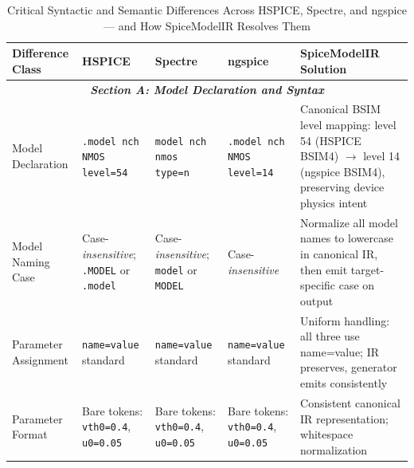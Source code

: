 
\begin{table}[!t]
\caption{Critical Syntactic and Semantic Differences Across HSPICE, Spectre, and ngspice — and How SpiceModelIR Resolves Them}
\label{tab:critical_diffs}
\centering
\renewcommand{\arraystretch}{1.3}
\begin{tabular}{@{}p{2.2cm}p{2.8cm}p{2.8cm}p{2.8cm}p{3.8cm}@{}}
\toprule
\textbf{Difference Class} & \textbf{HSPICE} & \textbf{Spectre} & \textbf{ngspice} & \textbf{SpiceModelIR Solution} \\
\midrule

\multicolumn{5}{c}{\textit{\textbf{Section A: Model Declaration and Syntax}}} \\
\midrule

Model Declaration & \texttt{.model nch NMOS level=54} & \texttt{model nch nmos type=n} & \texttt{.model nch NMOS level=14} & Canonical BSIM level mapping: level 54 (HSPICE BSIM4) $\rightarrow$ level 14 (ngspice BSIM4), preserving device physics intent \\

Model Naming Case & Case-\emph{insensitive}; \newline \texttt{.MODEL} or \texttt{.model} & Case-\emph{insensitive}; \newline \texttt{model} or \texttt{MODEL} & Case-\emph{insensitive} & Normalize all model names to lowercase in canonical IR, then emit target-specific case on output \\

Parameter Assignment & \texttt{name=value} standard & \texttt{name=value} standard & \texttt{name=value} standard & Uniform handling: all three use name=value; IR preserves, generator emits consistently \\

Parameter Format & Bare tokens: \newline \texttt{vth0=0.4}, \newline \texttt{u0=0.05} & Bare tokens: \newline \texttt{vth0=0.4}, \newline \texttt{u0=0.05} & Bare tokens: \newline \texttt{vth0=0.4}, \newline \texttt{u0=0.05} & Consistent canonical IR representation; whitespace normalization \\


\end{tabular}
\end{table}
